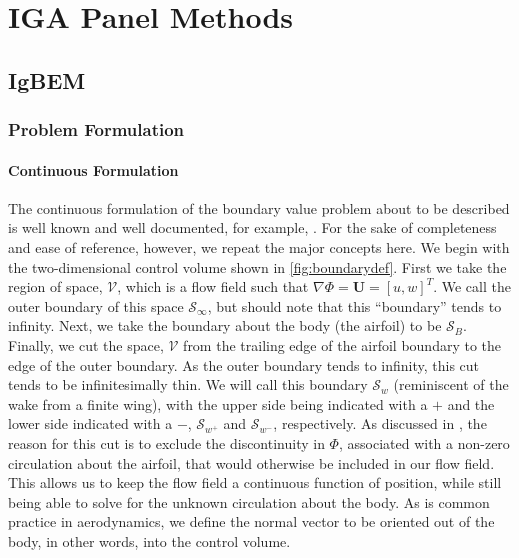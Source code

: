 


	
	\chapter*{IGA Panel Methods}
	\label{ch:igapanel}
	
	\section{IgBEM}
	\label{sec:igbem}
	
	\subsection{Problem Formulation}
	\label{ssec:probform}
	
	\subsubsection{Continuous Formulation}
	\label{sssec:contform}
	
	The continuous formulation of the boundary value problem about to be described is well known and well documented, for example, \cite{moran1984, Kostas2017Shape-optimizat, Politis2014}. For the sake of completeness and ease of reference, however, we repeat the major concepts here. We begin with the two-dimensional control volume shown in \cref{fig:boundarydef}. First we take the region of space, \( \mathscr{V} \), which is a flow field such that \( \nabla \Phi = \mathbf{U} = [u, w]^T\). We call the outer boundary of this space \( \mathcal{S}_{\infty} \), but should note that this ``boundary'' tends to infinity. Next, we take the boundary about the body (the airfoil) to be \( \mathcal{S}_B \). Finally, we cut the space, \( \mathscr{V} \) from the trailing edge of the airfoil boundary to the edge of the outer boundary. As the outer boundary tends to infinity, this cut tends to be infinitesimally thin. We will call this boundary \( \mathcal{S}_w \) (reminiscent of the wake from a finite wing), with the upper side being indicated with a \(+\) and the lower side indicated with a \(-\), \( \mathcal{S}_{w^+} \) and \( \mathcal{S}_{w^-} \), respectively. As discussed in \cite{moran1984}, the reason for this cut is to exclude the discontinuity in \( \Phi \), associated with a non-zero circulation about the airfoil, that would otherwise be included in our flow field. This allows us to keep the flow field a continuous function of position, while still being able to solve for the unknown circulation about the body. As is common practice in aerodynamics, we define the normal vector to be oriented out of the body, in other words, into the control volume.
	
